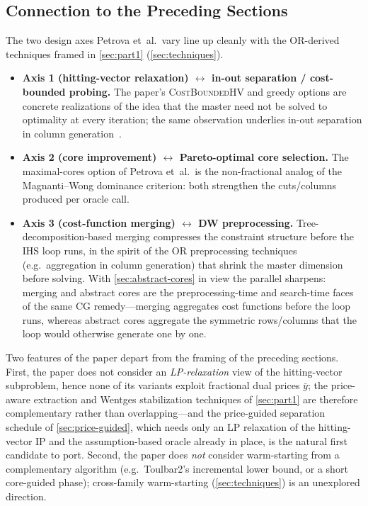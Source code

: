 \subsection{Connection to the Preceding Sections}
\label{sec:wcspconnect}

The two design axes Petrova et~al.\ vary line up cleanly with the OR-derived
techniques framed in \cref{sec:part1} (\cref{sec:techniques}).

\begin{itemize}
\item \textbf{Axis 1 (hitting-vector relaxation) $\leftrightarrow$
in-out separation / cost-bounded probing.} The paper's \textsc{CostBoundedHV}
and greedy options are concrete realizations of the idea that the master
need not be solved to optimality at every iteration; the same observation
underlies in-out separation in column generation~\citep{benameur2007stabilization}.

\item \textbf{Axis 2 (core improvement) $\leftrightarrow$ Pareto-optimal
core selection.} The maximal-cores option of Petrova et~al.\ is the
non-fractional analog of the Magnanti--Wong dominance criterion: both
strengthen the cuts/columns produced per oracle call.

\item \textbf{Axis 3 (cost-function merging) $\leftrightarrow$ DW
preprocessing.} Tree-decomposition-based merging compresses the
constraint structure before the IHS loop runs, in the spirit of the OR
preprocessing techniques (e.g.\ aggregation in column generation) that
shrink the master dimension before solving. With
\cref{sec:abstract-cores} in view the parallel sharpens: merging and
abstract cores are the preprocessing-time and search-time faces of the
same CG remedy---merging aggregates cost functions before the loop runs,
whereas abstract cores aggregate the symmetric rows/columns that the loop
would otherwise generate one by one.
\end{itemize}

Two features of the paper depart from the framing of the preceding sections.
First, the paper does not consider an \emph{LP-relaxation} view of the
hitting-vector subproblem, hence none of its variants exploit fractional dual
prices $\bar{y}$; the price-aware extraction and Wentges stabilization
techniques of \cref{sec:part1} are therefore complementary rather than
overlapping---and the price-guided separation schedule of
\cref{sec:price-guided}, which needs only an LP relaxation of the
hitting-vector IP and the assumption-based oracle already in place, is the
natural first candidate to port. Second, the paper does \emph{not} consider warm-starting from a
complementary algorithm (e.g.\ Toulbar2's incremental lower bound, or a short
core-guided phase); cross-family warm-starting (\cref{sec:techniques}) is an
unexplored direction.

